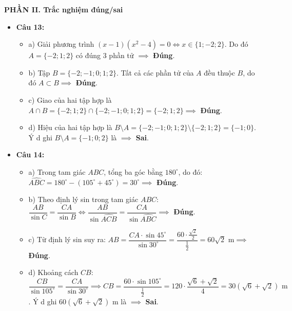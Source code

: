 \documentclass[12pt,a4paper]{article}
\begin{document}
\vspace{0.15cm}
\textbf{PHẦN II. Trắc nghiệm đúng/sai}
\begin{itemize}[leftmargin=0.6cm, itemsep=1.5pt, topsep=1pt]
    \item \textbf{Câu 13:}
    \begin{itemize}[itemsep=1pt]
        \item a) Giải phương trình $(x - 1)(x^2 - 4) = 0 \iff x \in \{1; -2; 2\}$. Do đó $A = \{-2; 1; 2\}$ có đúng $3$ phần tử $\implies$ \textbf{Đúng}.
        \item b) Tập $B = \{-2; -1; 0; 1; 2\}$. Tất cả các phần tử của $A$ đều thuộc $B$, do đó $A \subset B \implies$ \textbf{Đúng}.
        \item c) Giao của hai tập hợp là $A \cap B = \{-2; 1; 2\} \cap \{-2; -1; 0; 1; 2\} = \{-2; 1; 2\} \implies$ \textbf{Đúng}.
        \item d) Hiệu của hai tập hợp là $B \setminus A = \{-2; -1; 0; 1; 2\} \setminus \{-2; 1; 2\} = \{-1; 0\}$. Ý d ghi $B \setminus A = \{-1; 0; 2\}$ là $\implies$ \textbf{Sai}.
    \end{itemize}

    \item \textbf{Câu 14:}
    \begin{itemize}[itemsep=1pt]
        \item a) Trong tam giác $ABC$, tổng ba góc bằng $180^\circ$, do đó: $\widehat{ABC} = 180^\circ - (105^\circ + 45^\circ) = 30^\circ \implies$ \textbf{Đúng}.
        \item b) Theo định lý sin trong tam giác $ABC$: $\dfrac{AB}{\sin C} = \dfrac{CA}{\sin B} \iff \dfrac{AB}{\sin \widehat{ACB}} = \dfrac{CA}{\sin \widehat{ABC}} \implies$ \textbf{Đúng}.
        \item c) Từ định lý sin suy ra: $AB = \dfrac{CA \cdot \sin 45^\circ}{\sin 30^\circ} = \dfrac{60 \cdot \frac{\sqrt{2}}{2}}{\frac{1}{2}} = 60\sqrt{2}\text{ m} \implies$ \textbf{Đúng}.
        \item d) Khoảng cách $CB$: $\dfrac{CB}{\sin 105^\circ} = \dfrac{CA}{\sin 30^\circ} \implies CB = \dfrac{60 \cdot \sin 105^\circ}{\frac{1}{2}} = 120 \cdot \dfrac{\sqrt{6} + \sqrt{2}}{4} = 30(\sqrt{6} + \sqrt{2})\text{ m}$. Ý d ghi $60(\sqrt{6} + \sqrt{2})\text{ m}$ là $\implies$ \textbf{Sai}.
    \end{itemize}
\end{itemize}
\end{document}
